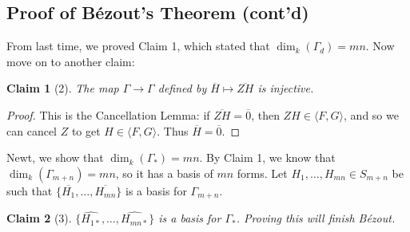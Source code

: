 \documentclass[12pt]{article}
\newcommand{\vbrack}[1]{\langle #1\rangle}
\newtheorem*{claim}{Claim}
\theoremstyle{definition}
\begin{document}
\subsection{Proof of B\'ezout's Theorem (cont'd)}
From last time, we proved Claim 1, which stated that $\dim_k(\Gamma_d)=mn$. Now move on to another claim:
\begin{claim}[2]
    The map $\Gamma\to\Gamma$ defined by $\overline{H}\mapsto\overline{ZH}$ is injective.
\end{claim}
\begin{proof}
    This is the Cancellation Lemma: if $\overline{ZH}=\overline{0}$, then $ZH\in\vbrack{F,G}$, and so we can cancel $Z$ to get $H\in\vbrack{F,G}$. Thus $\overline{H}=\overline{0}$.
\end{proof}
Newt, we show that $\dim_k(\Gamma_*)=mn$. By Claim 1, we know that $\dim_k(\Gamma_{m+n})=mn$, so it has a basis of $mn$ forms. Let $H_1,\dotsc,H_{mn}\in S_{m+n}$ be such that $\{\overline{H_1},\dotsc,\overline{H_{mn}}\}$ is a basis for $\Gamma_{m+n}$. 
\begin{claim}[3]
    $\{\widehat{H_{1*}},\dotsc,\widehat{H_{mn*}}\}$ is a basis for $\Gamma_*$. Proving this will finish B\'ezout.
\end{claim}
\end{document}
